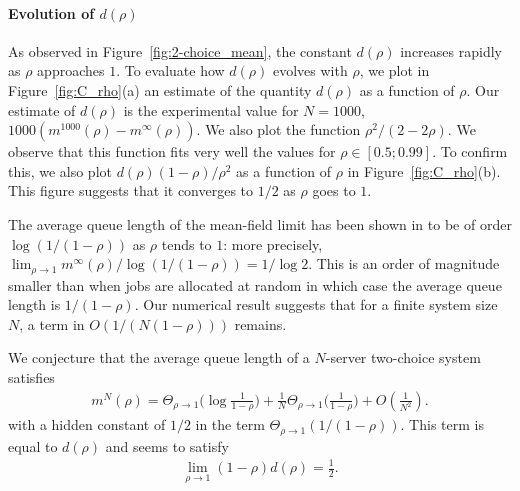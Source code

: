 \documentclass[acmlarge]{acmart}
\newcommand\p[1]{\left(#1\right)}
\begin{document}
\paragraph*{Evolution of $d(\rho)$}
As observed in Figure~\ref{fig:2-choice_mean}, the constant $d(\rho)$
increases rapidly as $\rho$ approaches $1$.  To evaluate how $d(\rho)$
evolves with $\rho$, we plot in Figure~\ref{fig:C_rho}(a) an estimate
of the quantity $d(\rho)$ as a function of $\rho$. Our estimate of
$d(\rho)$ is the experimental value for $N=1000$,
$1000(m^{1000}(\rho)-m^\infty(\rho))$.  We also plot the function
$\rho^2/(2-2\rho)$.  We observe that this function fits very well the
values for $\rho\in[0.5;0.99]$. To confirm this, we also plot
$d(\rho)(1-\rho)/\rho^2$ as a function of $\rho$ in
Figure~\ref{fig:C_rho}(b). This figure suggests that it converges to
$1/2$ as $\rho$ goes to $1$.

The average queue length of the mean-field limit has been shown in
\cite{mitzenmacher1996power} to be of order $\log (1/(1-\rho))$ as
$\rho$ tends to $1$: more precisely,
$\lim_{\rho\to1}m^\infty(\rho) / \log(1/(1-\rho)) = 1/\log2$.  This is
an order of magnitude smaller than when jobs are allocated at random
in which case the average queue length is $1/(1-\rho)$. Our numerical
result suggests that for a finite system size $N$, a term in
$O(1/(N(1-\rho)))$ remains.

We conjecture that the average queue length of a $N$-server two-choice
system satisfies 
\begin{align*}
  m^N(\rho) = \Theta_{\rho\to1}\Big(\log\frac1{1-\rho}\Big)
  + \frac{1}{N}\Theta_{\rho\to1}\Big(\frac{1}{1-\rho}\Big) +
  O\p{\frac1{N^2}}. 
\end{align*}
with a hidden constant of $1/2$ in the term
$\Theta_{\rho\to1}(1/(1-\rho))$. This term is equal to $d(\rho)$ and
seems to satisfy
\begin{align*}
  \lim_{\rho\to1}  (1-\rho) d(\rho)  = \frac12.
\end{align*}
\end{document}
